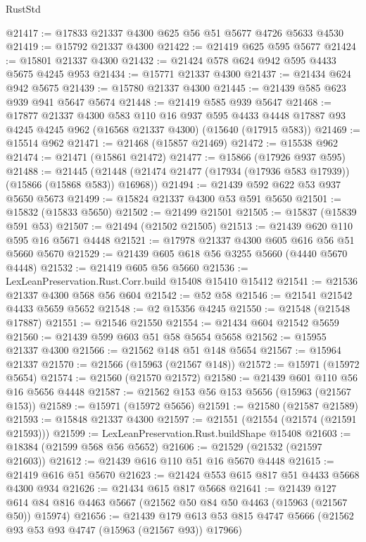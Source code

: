 \begin{lexlean}{RustStd}
\begin{coremodule}
@21417 := @17833 @21337 @4300 @625 @56 @51 @5677 @4726 @5633 @4530
@21419 := @15792 @21337 @4300
@21422 := @21419 @625 @595 @5677
@21424 := @15801 @21337 @4300
@21432 := @21424 @578 @624 @942 @595 @4433 @5675 @4245 @953
@21434 := @15771 @21337 @4300
@21437 := @21434 @624 @942 @5675
@21439 := @15780 @21337 @4300
@21445 := @21439 @585 @623 @939 @941 @5647 @5674
@21448 := @21419 @585 @939 @5647
@21468 := @17877
    @21337
    @4300
    @583
    @110
    @16
    @937
    @595
    @4433
    @4448
    @17887
    @93
    @4245
    @4245
    @962
    (@16568 @21337 @4300)
    (@15640 (@17915 @583))
@21469 := @15514 @962
@21471 := @21468 (@15857 @21469)
@21472 := @15538 @962
@21474 := @21471 (@15861 @21472)
@21477 := @15866 (@17926 @937 @595)
@21488 := @21445
    (@21448 (@21474 @21477 (@17934 (@17936 @583 @17939)) (@15866 (@15868 @583)) @16968))
@21494 := @21439 @592 @622 @53 @937 @5650 @5673
@21499 := @15824 @21337 @4300 @53 @591 @5650
@21501 := @15832 (@15833 @5650)
@21502 := @21499 @21501
@21505 := @15837 (@15839 @591 @53)
@21507 := @21494 (@21502 @21505)
@21513 := @21439 @620 @110 @595 @16 @5671 @4448
@21521 := @17978 @21337 @4300 @605 @616 @56 @51 @5660 @5670
@21529 := @21439 @605 @618 @56 @3255 @5660 (@4440 @5670 @4448)
@21532 := @21419 @605 @56 @5660
@21536 := LexLeanPreservation.Rust.Corr.build @15408 @15410 @15412
@21541 := @21536 @21337 @4300 @568 @56 @604
@21542 := @52 @58
@21546 := @21541 @21542 @4433 @5659 @5652
@21548 := @2 @15356 @4245
@21550 := @21548 (@21548 @17887)
@21551 := @21546 @21550
@21554 := @21434 @604 @21542 @5659
@21560 := @21439 @599 @603 @51 @58 @5654 @5658
@21562 := @15955 @21337 @4300
@21566 := @21562 @148 @51 @148 @5654
@21567 := @15964 @21337
@21570 := @21566 (@15963 (@21567 @148))
@21572 := @15971 (@15972 @5654)
@21574 := @21560 (@21570 @21572)
@21580 := @21439 @601 @110 @56 @16 @5656 @4448
@21587 := @21562 @153 @56 @153 @5656 (@15963 (@21567 @153))
@21589 := @15971 (@15972 @5656)
@21591 := @21580 (@21587 @21589)
@21593 := @15848 @21337 @4300
@21597 := @21551 (@21554 (@21574 (@21591 @21593)))
@21599 := LexLeanPreservation.Rust.buildShape @15408
@21603 := @18384 (@21599 @568 @56 @5652)
@21606 := @21529 (@21532 (@21597 @21603))
@21612 := @21439 @616 @110 @51 @16 @5670 @4448
@21615 := @21419 @616 @51 @5670
@21623 := @21424 @553 @615 @817 @51 @4433 @5668 @4300 @934
@21626 := @21434 @615 @817 @5668
@21641 := @21439
    @127
    @614
    @84
    @816
    @4463
    @5667
    (@21562 @50 @84 @50 @4463 (@15963 (@21567 @50)) @15974)
@21656 := @21439
    @179
    @613
    @53
    @815
    @4747
    @5666
    (@21562 @93 @53 @93 @4747 (@15963 (@21567 @93)) @17966)

\end{coremodule}
\end{lexlean}
